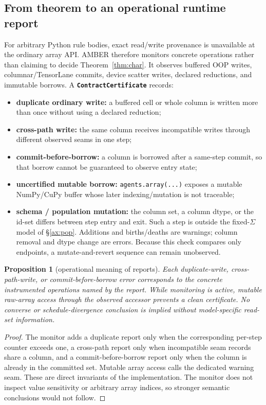 \documentclass[sigconf,nonacm,review,natbib=true]{acmart}
\newtheorem{proposition}{Proposition}
\theoremstyle{definition}
\theoremstyle{plain}
\theoremstyle{remark}
\begin{document}
\subsection{From theorem to an operational runtime report}\label{ax:cert}

For arbitrary Python rule bodies, exact read/write provenance is unavailable at
the ordinary array API. AMBER therefore monitors concrete operations rather
than claiming to decide Theorem~\ref{thm:char}. It observes buffered OOP writes,
columnar/TensorLane commits, device scatter writes, declared reductions, and
immutable borrows. A \textbf{\texttt{ContractCertificate}} records:

\begin{itemize}
\item \textbf{duplicate ordinary write:} a buffered cell or whole column is
written more than once without using a declared reduction;
\item \textbf{cross-path write:} the same column receives incompatible writes
through different observed seams in one step;
\item \textbf{commit-before-borrow:} a column is borrowed after a same-step
commit, so that borrow cannot be guaranteed to observe entry state;
\item \textbf{uncertified mutable borrow:} \texttt{agents.array(...)} exposes a
mutable NumPy/CuPy buffer whose later indexing/mutation is not traceable;
\item \textbf{schema / population mutation:} the column set, a column dtype,
or the id-set differs between step entry and exit. Such a step is outside the
fixed-$\Sigma$ model of \S\ref{ax:pop}. Additions and births/deaths are warnings;
column removal and dtype change are errors. Because this check compares only
endpoints, a mutate-and-revert sequence can remain unobserved.
\end{itemize}

\begin{proposition}[operational meaning of reports]\label{prop:errorsound}
Each duplicate-write, cross-path-write, or commit-before-borrow error
corresponds to the concrete instrumented operations named by the report. While
monitoring is active, mutable raw-array access through the observed accessor
prevents a clean certificate. No converse or schedule-divergence conclusion is
implied without model-specific read-set information.
\end{proposition}

\begin{proof} The monitor adds a duplicate report only when the corresponding
per-step counter exceeds one, a cross-path report only when incompatible seam
records share a column, and a commit-before-borrow report only when the column
is already in the committed set. Mutable array access calls the dedicated
warning seam. These are direct invariants of the implementation. The monitor
does not inspect value sensitivity or arbitrary array indices, so stronger
semantic conclusions would not follow.\end{proof}
\end{document}
